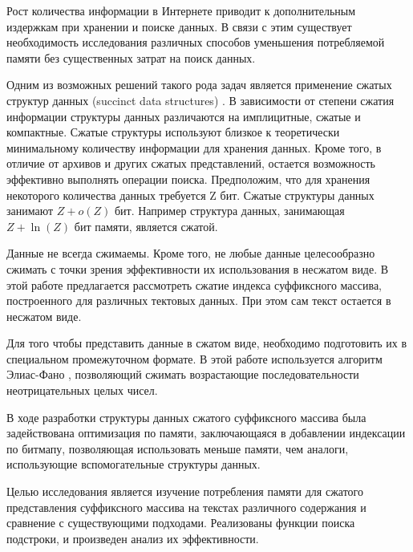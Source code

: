 Рост количества информации в Интернете приводит к дополнительным издержкам при хранении и поиске данных.
В связи с этим существует необходимость исследования различных способов уменьшения потребляемой памяти без
существенных затрат на поиск данных.

Одним из возможных решений такого рода задач является применение сжатых структур данных
(succinct data structures) \cite{jacobson1988succinct}.
В зависимости от степени сжатия информации структуры данных различаются на имплицитные, сжатые и компактные.
Сжатые структуры используют близкое к теоретически минимальному количеству информации для хранения данных.
Кроме того, в отличие от архивов и других сжатых представлений, остается возможность
эффективно выполнять операции поиска.
Предположим, что для хранения некоторого количества данных требуется Z бит.
Сжатые структуры данных занимают \(Z + o(Z)\) бит. Например структура данных, занимающая \(Z + \ln(Z)\) бит памяти,
является сжатой.

Данные не всегда сжимаемы. Кроме того, не любые данные целесообразно сжимать с точки зрения эффективности
их использования в несжатом виде. В этой работе предлагается рассмотреть сжатие индекса суффиксного массива,
построенного для различных тектовых данных. При этом сам текст остается в несжатом виде.

Для того чтобы представить данные в сжатом виде, необходимо подготовить их
в специальном промежуточном формате. В этой работе используется алгоритм Элиас-Фано \cite{pibiri2014dynamic},
позволяющий сжимать возрастающие последовательности неотрицательных целых чисел.

В ходе разработки структуры данных сжатого суффиксного массива была задействована оптимизация
по памяти, заключающаяся в добавлении индексации по битмапу, позволяющая использовать меньше памяти,
чем аналоги, использующие вспомогательные структуры данных.

Целью исследования является изучение потребления памяти для сжатого представления суффиксного массива
на текстах различного содержания и сравнение с существующими подходами.
Реализованы функции поиска подстроки, и произведен анализ их эффективности.

